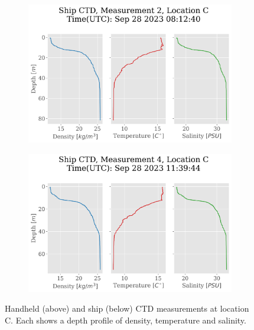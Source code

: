 \documentclass[a4paper,10pt,english]{article}
\begin{document}
\begin{figure}[H]
\begin{adjustwidth}{-2.5cm}{-2.5cm}
            \begin{subfigure}{0.65\textwidth}
                \centering
                \includegraphics[width=.9\linewidth]{../figures/ship_ctd/ship_ctd_Measurement_2_Location_C.png}
                \caption{}
                \label{fig:ship_m2lC}
            \end{subfigure}%
            \begin{subfigure}{0.65\textwidth}
                \centering
                \includegraphics[width=.9\linewidth]{../figures/ship_ctd/ship_ctd_Measurement_4_Location_C.png}
                \caption{}
                \label{fig:ship_m4lC}
            \end{subfigure}
            \end{adjustwidth}
        
            \caption{Handheld (above) and ship (below) CTD measurements at location C. Each shows a depth profile of density, temperature and salinity.}
            \label{fig:location_Capp}
        \end{figure}
    
\end{document}
